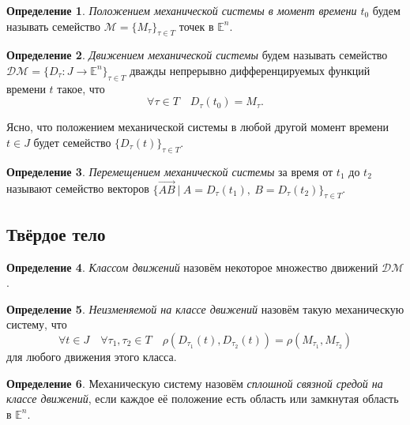 \documentclass{article}
\theoremstyle{definition}
\newtheorem{definition}{Определение}[section]
\theoremstyle{plain}
\theoremstyle{remark}
\numberwithin{equation}{section}
\newcommand{\vv}[1]{\overrightarrow{#1}}
\begin{document}
\begin{definition}
  \textit{Положением механической системы в момент времени $t_0$} будем называть
  семейство $\mathcal{M} = \{ M_\tau \}_{\tau \in T}$ точек в $\mathbb{E}^n$.
\end{definition}

\begin{definition}
  \textit{Движением механической системы} будем называть семейство
  $\mathcal{DM} = \{ D_\tau : J \to \mathbb{E}^n \}_{\tau \in T}$ дважды
  непрерывно дифференцируемых функций времени $t$ такое, что
  \begin{equation*}
    \forall \tau \in T \quad D_\tau(t_0) = M_\tau.
  \end{equation*}

  Ясно, что положением механической системы в любой другой момент времени
  $t \in J$ будет семейство $\{D_\tau(t)\}_{\tau \in T}$.
\end{definition}

\begin{definition}
  \textit{Перемещением механической системы} за время от $t_1$ до $t_2$ называют
  семейство векторов $\{ \vv{AB}~|~A = D_\tau(t_1),~ B = D_\tau(t_2) \}_{\tau 
  \in T}$.
\end{definition}

\subsection{Твёрдое тело}

\begin{definition}
  \textit{Классом движений} назовём некоторое множество движений $\mathcal{DM}$.
\end{definition}

\begin{definition}
  \textit{Неизменяемой на классе движений} назовём такую механическую систему,
  что
  \begin{equation*}
    \forall t \in J \quad \forall \tau_1, \tau_2 \in T \quad
      \rho(D_{\tau_1}(t), D_{\tau_2}(t)) = \rho(M_{\tau_1}, M_{\tau_2})
  \end{equation*}
  для любого движения этого класса.
\end{definition}

\begin{definition}
  Механическую систему назовём \textit{сплошной связной средой на классе
  движений}, если каждое её положение есть область или замкнутая область в
  $\mathbb{E}^n$.
\end{definition}
\end{document}

